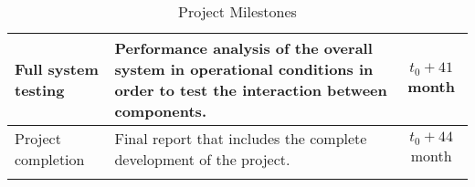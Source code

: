 \begin{longtable}[H]{>{\raggedright\arraybackslash}p{4cm} p{8cm} c}
	\midrule
	
	Full system testing & Performance analysis of the overall system in operational conditions in order to test the interaction between components.& $t_0 + 41$ month\vspace{0.2cm} \\
	
	\midrule
	
	Project completion & Final report that includes the complete development of the project.& $t_0 + 44$ month\vspace{0.2cm} \\
	
	\bottomrule[2pt]
	
	\caption{Project Milestones}
	\label{tabla_milestones}
\end{longtable}